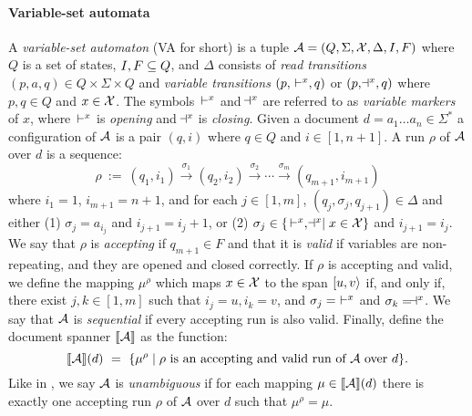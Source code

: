 \paragraph{Variable-set automata} 
A {\it variable-set automaton} (VA for short) is a tuple $\mathcal{A} = (Q, \Sigma, \mathcal{X}, \Delta, I, F)$ where $Q$ is a set of states, $I,F\subseteq Q$, and $\Delta$ consists of {\it read transitions} $(p,a,q)\in Q\times\Sigma\times Q$ and {\it variable transitions} $(p, \, \vdash^{x}, q)$ or $(p,\!\dashv^{x},q)$ where $p, q\in Q$ and $x\in \mathcal{X}$.
The symbols $\, \vdash^{x}$ and $\!\dashv^{x}$ are referred to as {\it variable markers} of $x$, where $\, \vdash^{x}$ is {\it opening} and $\!\dashv^{x}$ is {\it closing}. Given a document $d = a_1\ldots a_n \in \Sigma^*$ a configuration of $\mathcal{A}$ is a pair $(q,i)$ where $q\in Q$ and $i\in [1, n+1]$. 
A run $\rho$ of $\mathcal{A}$ over $d$ is a sequence:
\[
\rho \ := \ (q_1, i_1)\xrightarrow{\sigma_1} (q_2,i_2) \xrightarrow{\sigma_2}\cdots\xrightarrow{\sigma_m}(q_{m+1}, i_{m+1})
\] 
where $i_1 = 1$, $i_{m+1} = n+1$, and for each $j\in[1,m]$, $(q_j, \sigma_{j},q_{j+1}) \in \Delta$ and either 
(1) $\sigma_{j} = a_{i_j}$ and $i_{j+1} = i_j + 1$, or (2) $\sigma_{j}\in \{\, \vdash^{x} , \!\dashv^{x}\mid x\in\mathcal{X}\}$ and $i_{j+1} = i_j$. We say that $\rho$ is {\it accepting} if $q_{m+1}\in F$ and that it is {\it valid} if variables are non-repeating, and they are opened and closed correctly. 
If $\rho$ is accepting and valid, we define the mapping $\mu^\rho$ which maps $x\in \mathcal{X}$ to the span $[u,v\rangle$ if, and only if, there exist $j,k\in[1,m]$ such that $i_j = u, i_k = v$, and $\sigma_j =\, \, \vdash^{x}$ and $\sigma_k = \!\dashv^{x}$. We say that $\mathcal{A}$ is {\it sequential} if every accepting run is also valid. Finally, define the document spanner ${\llbracket{\mathcal{A}}\rrbracket}$ as the function:
\[
{\llbracket{\mathcal{A}}\rrbracket}(d) \ = \  \{\mu^\rho\mid \rho \text{ is an accepting and valid run of $\mathcal{A}$ over $d$}\}.
\] 
Like in \rts, we say $\mathcal{A}$ is {\it unambiguous} if for each mapping $\mu\in{\llbracket{\mathcal{A}}\rrbracket}(d)$ there is exactly one accepting run $\rho$ of $\mathcal{A}$ over $d$ such that $\mu^\rho = \mu$.

